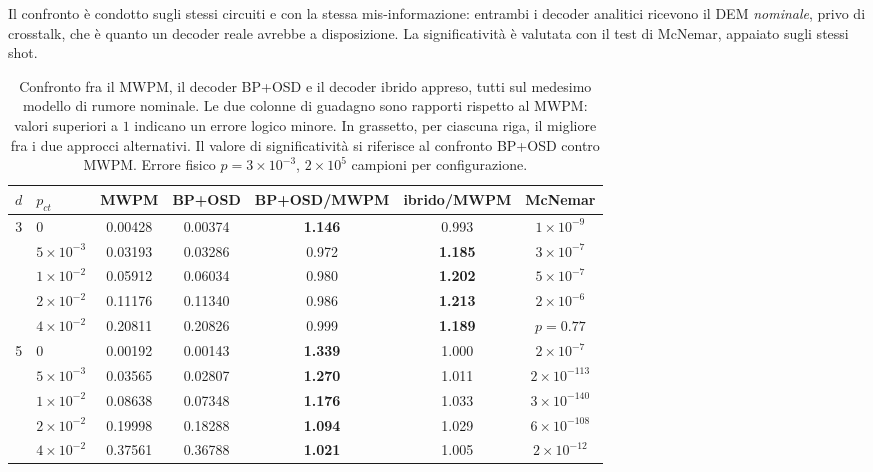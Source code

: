 Il confronto è condotto sugli stessi circuiti e con la stessa mis-informazione: entrambi i decoder analitici ricevono il \ac{DEM} \emph{nominale}, privo di crosstalk, che è quanto un decoder reale avrebbe a disposizione. La significatività è valutata con il test di McNemar, appaiato sugli stessi shot.

\begin{table}[H]

\centering
\footnotesize
\setlength{\tabcolsep}{4pt}
\begin{tabular}{clccccc}
\toprule
$d$ & $p_{ct}$ & \textbf{MWPM} & \textbf{BP+OSD} & \textbf{BP+OSD/MWPM} & \textbf{ibrido/MWPM} & \textbf{McNemar} \\
\midrule
\multirow{5}{*}{3} & $0$              & 0.00428 & 0.00374 & \textbf{1.146} & 0.993 & $1\times10^{-9}$ \\
\addlinespace[0.3em]
                   & $5\times10^{-3}$ & 0.03193 & 0.03286 & 0.972          & \textbf{1.185} & $3\times10^{-7}$ \\
\addlinespace[0.3em]
                   & $1\times10^{-2}$ & 0.05912 & 0.06034 & 0.980          & \textbf{1.202} & $5\times10^{-7}$ \\
\addlinespace[0.3em]
                   & $2\times10^{-2}$ & 0.11176 & 0.11340 & 0.986          & \textbf{1.213} & $2\times10^{-6}$ \\
\addlinespace[0.3em]
                   & $4\times10^{-2}$ & 0.20811 & 0.20826 & 0.999          & \textbf{1.189} & $p = 0.77$ \\
\midrule
\multirow{5}{*}{5} & $0$              & 0.00192 & 0.00143 & \textbf{1.339} & 1.000 & $2\times10^{-7}$ \\
\addlinespace[0.3em]
                   & $5\times10^{-3}$ & 0.03565 & 0.02807 & \textbf{1.270} & 1.011 & $2\times10^{-113}$ \\
\addlinespace[0.3em]
                   & $1\times10^{-2}$ & 0.08638 & 0.07348 & \textbf{1.176} & 1.033 & $3\times10^{-140}$ \\
\addlinespace[0.3em]
                   & $2\times10^{-2}$ & 0.19998 & 0.18288 & \textbf{1.094} & 1.029 & $6\times10^{-108}$ \\
\addlinespace[0.3em]
                   & $4\times10^{-2}$ & 0.37561 & 0.36788 & \textbf{1.021} & 1.005 & $2\times10^{-12}$ \\
\bottomrule
\end{tabular}
\caption[BP+OSD contro MWPM e contro il decoder ibrido]{Confronto fra il \ac{MWPM}, il decoder BP+OSD e il decoder ibrido appreso, tutti sul medesimo modello di rumore nominale. Le due colonne di guadagno sono rapporti rispetto al \ac{MWPM}: valori superiori a $1$ indicano un errore logico minore. In grassetto, per ciascuna riga, il migliore fra i due approcci alternativi. Il valore di significatività si riferisce al confronto BP+OSD contro \ac{MWPM}. Errore fisico $p = 3\times10^{-3}$, $2\times10^{5}$ campioni per configurazione.}\label{tab:confronto_bposd}

\end{table}

